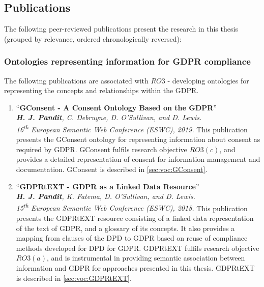 \subsection{Publications}\label{sec:intro:publications}
The following peer-reviewed publications present the research in this thesis (grouped by relevance, ordered chronologically reversed):

\subsubsection{Ontologies representing information for GDPR compliance}
The following publications are associated with $RO3$ - developing ontologies for representing the concepts and relationships within the GDPR.
\begin{enumerate}[start]
    \item ``\textbf{GConsent - A Consent Ontology Based on the GDPR}'' \cite{pandit_gconsent_2019} \\
    \textit{\textbf{H. J. Pandit}, C. Debruyne, D. O’Sullivan, and D. Lewis.} \\ 
    \textit{16\textsuperscript{th} European Semantic Web Conference (ESWC), 2019.}
        \vspace{0.1cm} \newline
        This publication presents the GConsent ontology for representing information about consent as required by GDPR. GConsent fulfils research objective $RO3(c)$, and provides a detailed representation of consent for information management and documentation. GConsent is described in \autoref{sec:voc:GConsent}.
    \item ``\textbf{GDPRtEXT - GDPR as a Linked Data Resource}'' \cite{pandit_gdprtext_2018} \\
    \textit{\textbf{H. J. Pandit}, K. Fatema, D. O’Sullivan, and D. Lewis.} \\
    \textit{15\textsuperscript{th} European Semantic Web Conference (ESWC), 2018.}
        \vspace{0.1cm} \newline
        This publication presents the GDPRtEXT resource consisting of a linked data representation of the text of GDPR, and a glossary of its concepts. It also provides a mapping from clauses of the DPD to GDPR based on reuse of compliance methods developed for DPD for GDPR. GDPRtEXT fulfils research objective $RO3(a)$, and is instrumental in providing semantic association between information and GDPR for approaches presented in this thesis. GDPRtEXT is described in \autoref{sec:voc:GDPRtEXT}.

\end{enumerate}
